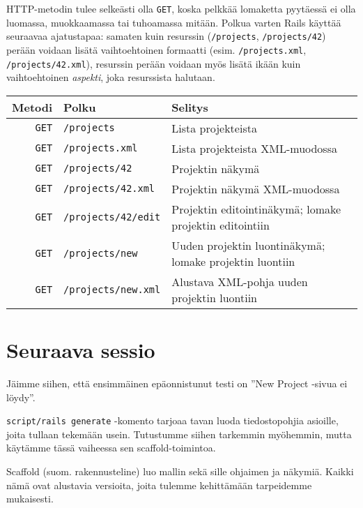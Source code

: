 \documentclass{article}
\newcommand{\pdfforeignlanguage}[2]{\texorpdfstring{\foreignlanguage{#1}{#2}}{#2}}
\newcommand{\eng}[1]{\pdfforeignlanguage{english}{#1}}
\begin{document}
\begin{samepage}
HTTP-metodin tulee selkeästi olla \texttt{GET}, koska pelkkää lomaketta
pyytäessä ei olla luomassa, muokkaamassa tai tuhoamassa mitään. Polkua varten
Rails käyttää seuraavaa ajatustapaa: samaten kuin resurssin
(\texttt{/projects}, \texttt{/projects/42}) perään voidaan lisätä
vaihtoehtoinen formaatti (esim. \texttt{/projects.xml},
\texttt{/projects/42.xml}), resurssin perään voidaan myös lisätä ikään kuin
vaihtoehtoinen \emph{aspekti}, joka resurssista halutaan.

\begin{tabular}{rll}
Metodi     & Polku                     & Selitys                                                 \\
\hline
\verb!GET! & \verb!/projects!          & Lista projekteista                                      \\
\verb!GET! & \verb!/projects.xml!      & Lista projekteista XML-muodossa                         \\
\hline
\verb!GET! & \verb!/projects/42!       & Projektin näkymä                                        \\
\verb!GET! & \verb!/projects/42.xml!   & Projektin näkymä XML-muodossa                           \\
\verb!GET! & \verb!/projects/42/edit!  & Projektin editointinäkymä; lomake projektin editointiin \\
\verb!GET! & \verb!/projects/new!      & Uuden projektin luontinäkymä; lomake projektin luontiin \\
\verb!GET! & \verb!/projects/new.xml!  & Alustava XML-pohja uuden projektin luontiin             \\
\end{tabular}
\end{samepage}

\section{Seuraava sessio}

Jäimme siihen, että ensimmäinen epäonnistunut testi on ''New Project -sivua ei
löydy''.

\texttt{script/rails generate} -komento tarjoaa tavan luoda tiedostopohjia
asioille, joita tullaan tekemään usein. Tutustumme siihen tarkemmin myöhemmin,
mutta käytämme tässä vaiheessa sen \eng{scaffold}-toimintoa.

\eng{Scaffold} (suom. rakennusteline) luo mallin sekä sille ohjaimen ja
näkymiä. Kaikki nämä ovat alustavia versioita, joita tulemme kehittämään
tarpeidemme mukaisesti.
\end{document}
